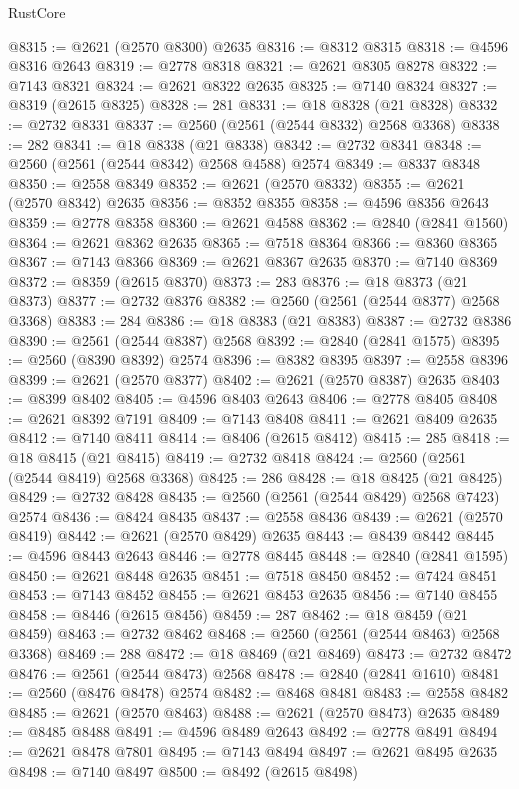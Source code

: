 \begin{lexlean}{RustCore}
\begin{coremodule}
@8315 := @2621 (@2570 @8300) @2635
@8316 := @8312 @8315
@8318 := @4596 @8316 @2643
@8319 := @2778 @8318
@8321 := @2621 @8305 @8278
@8322 := @7143 @8321
@8324 := @2621 @8322 @2635
@8325 := @7140 @8324
@8327 := @8319 (@2615 @8325)
@8328 := 281
@8331 := @18 @8328 (@21 @8328)
@8332 := @2732 @8331
@8337 := @2560 (@2561 (@2544 @8332) @2568 @3368)
@8338 := 282
@8341 := @18 @8338 (@21 @8338)
@8342 := @2732 @8341
@8348 := @2560 (@2561 (@2544 @8342) @2568 @4588) @2574
@8349 := @8337 @8348
@8350 := @2558 @8349
@8352 := @2621 (@2570 @8332)
@8355 := @2621 (@2570 @8342) @2635
@8356 := @8352 @8355
@8358 := @4596 @8356 @2643
@8359 := @2778 @8358
@8360 := @2621 @4588
@8362 := @2840 (@2841 @1560)
@8364 := @2621 @8362 @2635
@8365 := @7518 @8364
@8366 := @8360 @8365
@8367 := @7143 @8366
@8369 := @2621 @8367 @2635
@8370 := @7140 @8369
@8372 := @8359 (@2615 @8370)
@8373 := 283
@8376 := @18 @8373 (@21 @8373)
@8377 := @2732 @8376
@8382 := @2560 (@2561 (@2544 @8377) @2568 @3368)
@8383 := 284
@8386 := @18 @8383 (@21 @8383)
@8387 := @2732 @8386
@8390 := @2561 (@2544 @8387) @2568
@8392 := @2840 (@2841 @1575)
@8395 := @2560 (@8390 @8392) @2574
@8396 := @8382 @8395
@8397 := @2558 @8396
@8399 := @2621 (@2570 @8377)
@8402 := @2621 (@2570 @8387) @2635
@8403 := @8399 @8402
@8405 := @4596 @8403 @2643
@8406 := @2778 @8405
@8408 := @2621 @8392 @7191
@8409 := @7143 @8408
@8411 := @2621 @8409 @2635
@8412 := @7140 @8411
@8414 := @8406 (@2615 @8412)
@8415 := 285
@8418 := @18 @8415 (@21 @8415)
@8419 := @2732 @8418
@8424 := @2560 (@2561 (@2544 @8419) @2568 @3368)
@8425 := 286
@8428 := @18 @8425 (@21 @8425)
@8429 := @2732 @8428
@8435 := @2560 (@2561 (@2544 @8429) @2568 @7423) @2574
@8436 := @8424 @8435
@8437 := @2558 @8436
@8439 := @2621 (@2570 @8419)
@8442 := @2621 (@2570 @8429) @2635
@8443 := @8439 @8442
@8445 := @4596 @8443 @2643
@8446 := @2778 @8445
@8448 := @2840 (@2841 @1595)
@8450 := @2621 @8448 @2635
@8451 := @7518 @8450
@8452 := @7424 @8451
@8453 := @7143 @8452
@8455 := @2621 @8453 @2635
@8456 := @7140 @8455
@8458 := @8446 (@2615 @8456)
@8459 := 287
@8462 := @18 @8459 (@21 @8459)
@8463 := @2732 @8462
@8468 := @2560 (@2561 (@2544 @8463) @2568 @3368)
@8469 := 288
@8472 := @18 @8469 (@21 @8469)
@8473 := @2732 @8472
@8476 := @2561 (@2544 @8473) @2568
@8478 := @2840 (@2841 @1610)
@8481 := @2560 (@8476 @8478) @2574
@8482 := @8468 @8481
@8483 := @2558 @8482
@8485 := @2621 (@2570 @8463)
@8488 := @2621 (@2570 @8473) @2635
@8489 := @8485 @8488
@8491 := @4596 @8489 @2643
@8492 := @2778 @8491
@8494 := @2621 @8478 @7801
@8495 := @7143 @8494
@8497 := @2621 @8495 @2635
@8498 := @7140 @8497
@8500 := @8492 (@2615 @8498)

\end{coremodule}
\end{lexlean}
